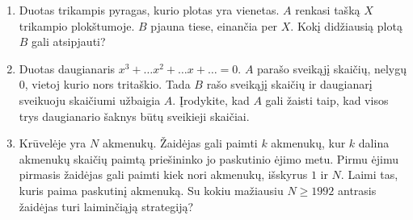 \begin{enumerate}

\item Duotas trikampis pyragas, kurio plotas yra vienetas. $A$ renkasi tašką
  $X$ trikampio plokštumoje. $B$ pjauna tiese, einančia per $X$. Kokį
  didžiausią plotą $B$ gali atsipjauti?


\item Duotas daugianaris $x^3+\dots x^2+\dots x+ \dots=0$. $A$ parašo
  sveikąjį skaičių, nelygų $0$, vietoj kurio nors tritaškio. Tada $B$ rašo
  sveikąjį skaičių ir daugianarį sveikuoju skaičiumi užbaigia $A$.
  Įrodykite, kad $A$ gali žaisti taip, kad visos trys daugianario šaknys būtų
  sveikieji skaičiai.


\item {} Krūvelėje yra $N$ akmenukų.
  Žaidėjas gali paimti $k$ akmenukų, kur $k$ dalina akmenukų skaičių paimtą
  priešininko jo paskutinio ėjimo metu. Pirmu ėjimu pirmasis žaidėjas gali
  paimti kiek nori akmenukų, išskyrus $1$ ir $N$. Laimi tas, kuris paima
  paskutinį akmenuką. Su kokiu mažiausiu $N\geq 1992$ antrasis žaidėjas
  turi laiminčiąją strategiją?



\end{enumerate}
